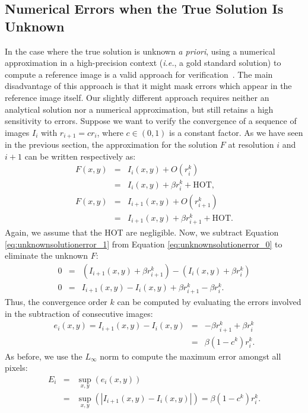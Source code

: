 \subsection{Numerical Errors when the True Solution Is Unknown}

In the case where the true solution is unknown {\em a priori}, using a numerical approximation in
a high-precision context ({\em i.e.}, a gold standard solution) to compute a reference image is a valid
approach for verification~\cite{Kronander10}.  The main disadvantage
of this approach is that it might mask errors which appear in the reference image
itself.
%
Our slightly different approach requires
neither an analytical solution nor a numerical approximation, but
still retains a high sensitivity to errors. Suppose
we want to verify the convergence of a sequence of images ${I_i}$
with $r_{i+1} = c r_{i}$, where $c \in (0,1)$ is a constant
factor. 
%
As we have seen in the previous section, the approximation for the
solution $F$ at resolution $i$ and $i+1$ can be written respectively as: 
\begin{eqnarray}
F(x,y) &=&I_i(x,y) + O(r_i^k) \nonumber\\
&=& I_i(x,y) + \beta r_i^k + \text{HOT},\label{eq:unknownsolutionerror_0} \\
F(x,y) &=& I_{i+1}(x,y) + O(r_{i+1}^k) \nonumber\\
&=& I_{i+1}(x,y) + \beta
r_{i+1}^k + \text{HOT}. \label{eq:unknownsolutionerror_1}
\end{eqnarray}
Again, we assume that the HOT are negligible. Now, we 
subtract Equation \eqref{eq:unknownsolutionerror_1} from
Equation \eqref{eq:unknownsolutionerror_0} to eliminate the unknown $F$:
\begin{eqnarray}
0 &=& (I_{i+1}(x,y) + \beta r_{i+1}^k) - (I_i(x,y) + \beta r_i^k)\\
0 &=& I_{i+1}(x,y)-I_{i}(x,y) + \beta r_{i+1}^k - \beta r_i^k.
\end{eqnarray}
Thus, the convergence order $k$ can be computed by evaluating the errors
involved in the subtraction of consecutive images:
\begin{eqnarray}
e_i(x,y) = I_{i+1}(x,y)-I_{i}(x,y) &=& -\beta r_{i+1}^k + \beta r_i^k\\
  &=& \beta(1 -c^k) r_i^k.
\end{eqnarray}
As before, we use the $L_\infty$ norm to compute the maximum error amongst
all pixels:
\begin{eqnarray}
E_i &=& \sup_{x,y}(e_i(x,y))\nonumber\\ 
    &=& \sup_{x,y}(|I_{i+1}(x,y)-I_{i}(x,y)|) = \beta(1-c^k) r_i^k.\label{eq:unknownsolutionerror}
\end{eqnarray}
